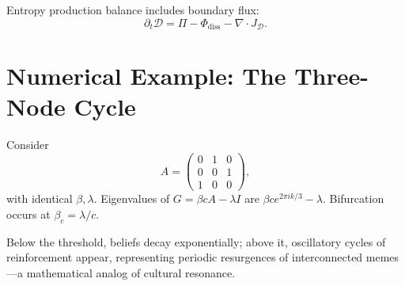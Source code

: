 \documentclass[11pt,a4paper]{article}
\newenvironment{narrative}{\begin{itshape}}{\end{itshape}}
\begin{document}
Entropy production balance includes boundary flux:
\[
\partial_t\mathcal D = \Pi - \Phi_{\text{diss}} - \nabla\!\cdot J_\mathcal D.
\]

\section{Numerical Example: The Three-Node Cycle}
Consider 
\[
A=\begin{pmatrix}0&1&0\\0&0&1\\1&0&0\end{pmatrix},
\]
with identical \(\beta,\lambda\).  
Eigenvalues of \(G=\beta cA-\lambda I\) are \(\beta c e^{2\pi i k/3}-\lambda\).  
Bifurcation occurs at \(\beta_c = \lambda / c\).  

\begin{narrative}
Below the threshold, beliefs decay exponentially; above it, oscillatory cycles of reinforcement appear, representing periodic resurgences of interconnected memes—a mathematical analog of cultural resonance.
\end{narrative}
\end{document}
